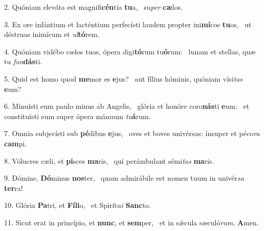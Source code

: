 2. Quóniam eleváta est magnifi\textbf{cén}tia \textbf{tu}a, \ast\  su\textit{per} \textbf{cæ}los.\

3. Ex ore infántium et lacténtium perfecísti laudem propter ini\textbf{mí}cos \textbf{tu}os, \ast\  ut déstruas inimícum et \textit{ul}\textbf{tó}rem.\

4. Quóniam vidébo cælos tuos, ópera digi\textbf{tó}rum tu\textbf{ó}rum: \ast\  lunam et stellas, quæ tu \textit{fun}\textbf{dás}ti.\

5. Quid est homo quod \textbf{me}mor es \textbf{e}jus? \ast\  aut fílius hóminis, quóniam vísi\textit{tas} \textbf{e}um?\

6. Minuísti eum paulo minus ab Angelis, \dag\  glória et honóre coro\textbf{nás}ti \textbf{e}um: \ast\  et constituísti eum super ópera mánuum \textit{tu}\textbf{á}rum.\

7. Omnia subjecísti sub \textbf{pé}dibus \textbf{e}jus, \ast\  oves et boves univérsas: ínsuper et péco\textit{ra} \textbf{cam}pi.\

8. Vólucres cæli, et \textbf{pi}sces \textbf{ma}ris, \ast\  qui perámbulant sémi\textit{tas} \textbf{ma}ris.\

9. Dómine, \textbf{Dó}minus \textbf{nos}ter, \ast\  quam admirábile est nomen tuum in univér\textit{sa} \textbf{ter}ra!\

10. Glória \textbf{Pa}tri, et \textbf{Fí}\textbf{li}o, \ast\  et Spirítu\textit{i} \textbf{Sanc}to.\

11. Sicut erat in princípio, et \textbf{nunc}, et \textbf{sem}per, \ast\  et in sǽcula sæculó\textit{rum}. \textbf{A}men.\

